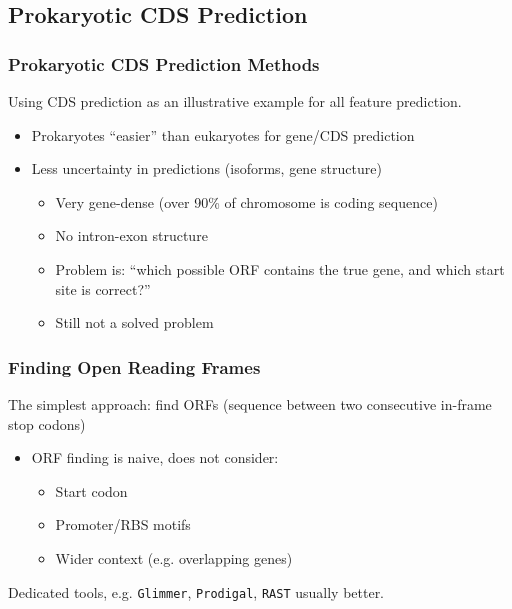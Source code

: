 
\subsection{Prokaryotic CDS Prediction}

\begin{frame}
  \frametitle{Prokaryotic CDS Prediction Methods}
  Using CDS prediction as an illustrative example for all feature prediction.\\[0.2cm]
  \begin{itemize}
    \item Prokaryotes ``easier'' than eukaryotes for gene/CDS prediction
    \item Less uncertainty in predictions (isoforms, gene structure)
    \begin{itemize}
      \item Very gene-dense (over 90\% of chromosome is coding sequence)
      \item No intron-exon structure
      \item Problem is: ``which possible ORF contains the true gene, and which start site is correct?''
      \item Still not a solved problem
    \end{itemize}       
  \end{itemize}
\end{frame}

\begin{frame}
  \frametitle{Finding Open Reading Frames}
  The simplest approach: find ORFs (sequence between two consecutive in-frame stop codons)
  \begin{itemize}
    \item<1-> ORF finding is naive, does not consider:
    \begin{itemize}
      \item Start codon
      \item Promoter/RBS motifs
      \item Wider context (e.g. overlapping genes)
    \end{itemize}
  \end{itemize}
  Dedicated tools, e.g. \texttt{Glimmer}, \texttt{Prodigal}, \texttt{RAST} usually better.
\end{frame}

